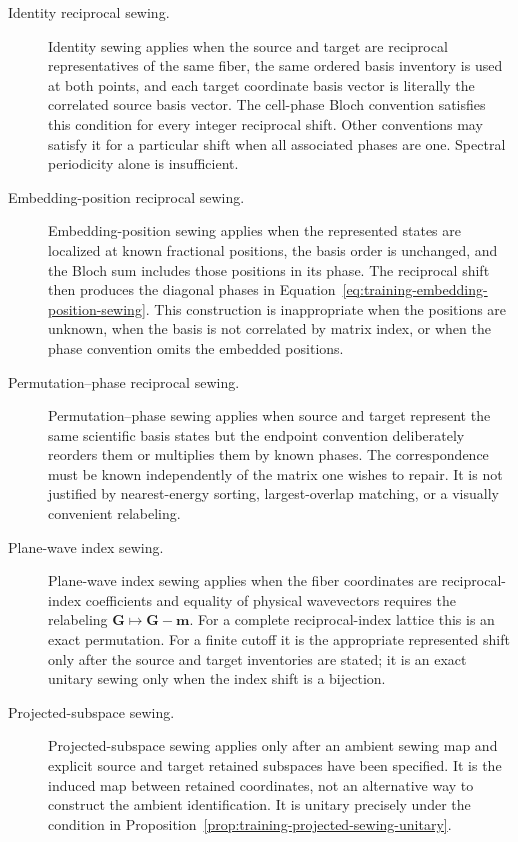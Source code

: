 \begin{description}
  \item[Identity reciprocal sewing.]
  Identity sewing applies when the source and target are reciprocal representatives
  of the same fiber, the same ordered basis inventory is used at both points,
  and each target coordinate basis vector is literally the correlated source
  basis vector. The cell-phase Bloch convention satisfies this condition for
  every integer reciprocal shift. Other conventions may satisfy it for a
  particular shift when all associated phases are one. Spectral periodicity
  alone is insufficient.

  \item[Embedding-position reciprocal sewing.]
  Embedding-position sewing applies when the represented states are localized at
  known fractional positions, the basis order is unchanged, and the Bloch sum
  includes those positions in its phase. The reciprocal shift then produces
  the diagonal phases in
  Equation~\eqref{eq:training-embedding-position-sewing}. This construction is
  inappropriate when the positions are unknown, when the basis is not
  correlated by matrix index, or when the phase convention omits the embedded
  positions.

  \item[Permutation--phase reciprocal sewing.]
  Permutation--phase sewing applies when source and target represent the same
  scientific basis states but the endpoint convention deliberately reorders
  them or multiplies them by known phases. The correspondence must be known
  independently of the matrix one wishes to repair. It is not justified by
  nearest-energy sorting, largest-overlap matching, or a visually convenient
  relabeling.

  \item[Plane-wave index sewing.]
  Plane-wave index sewing applies when the fiber coordinates are reciprocal-index
  coefficients and equality of physical wavevectors requires the relabeling
  \(\mathbf G\mapsto\mathbf G-\mathbf m\). For a complete reciprocal-index
  lattice this is an exact permutation. For a finite cutoff it is the
  appropriate represented shift only after the source and target inventories
  are stated; it is an exact unitary sewing only when the index shift is a
  bijection.

  \item[Projected-subspace sewing.]
  Projected-subspace sewing applies only after an ambient sewing map and explicit
  source and target retained subspaces have been specified. It is the induced
  map between retained coordinates, not an alternative way to construct the
  ambient identification. It is unitary precisely under the condition in
  Proposition~\ref{prop:training-projected-sewing-unitary}.


\end{description}
